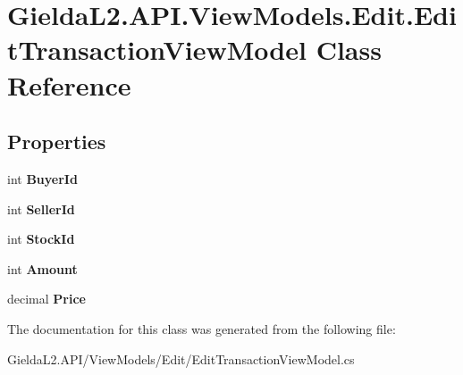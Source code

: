\hypertarget{class_gielda_l2_1_1_a_p_i_1_1_view_models_1_1_edit_1_1_edit_transaction_view_model}{}\section{Gielda\+L2.\+A\+P\+I.\+View\+Models.\+Edit.\+Edit\+Transaction\+View\+Model Class Reference}
\label{class_gielda_l2_1_1_a_p_i_1_1_view_models_1_1_edit_1_1_edit_transaction_view_model}
\subsection*{Properties}
\begin{DoxyCompactItemize}
\item 
\mbox{\label{class_gielda_l2_1_1_a_p_i_1_1_view_models_1_1_edit_1_1_edit_transaction_view_model_afd4891d3e034df892ca9b2ae1d6d6ae6}} 
int {\bfseries Buyer\+Id}
\item 
\mbox{\label{class_gielda_l2_1_1_a_p_i_1_1_view_models_1_1_edit_1_1_edit_transaction_view_model_a12d1a9452607f89f3192eeb4061d3571}} 
int {\bfseries Seller\+Id}
\item 
\mbox{\label{class_gielda_l2_1_1_a_p_i_1_1_view_models_1_1_edit_1_1_edit_transaction_view_model_a05599da5b4e51eb02c3954ee13adc6f9}} 
int {\bfseries Stock\+Id}
\item 
\mbox{\label{class_gielda_l2_1_1_a_p_i_1_1_view_models_1_1_edit_1_1_edit_transaction_view_model_a245082b7f5fcded9156d0e0a43d3b3e8}} 
int {\bfseries Amount}
\item 
\mbox{\label{class_gielda_l2_1_1_a_p_i_1_1_view_models_1_1_edit_1_1_edit_transaction_view_model_a857f5a8344e31733a7bf83982195a6be}} 
decimal {\bfseries Price}
\end{DoxyCompactItemize}


The documentation for this class was generated from the following file\+:\begin{DoxyCompactItemize}
\item 
Gielda\+L2.\+A\+P\+I/\+View\+Models/\+Edit/Edit\+Transaction\+View\+Model.\+cs\end{DoxyCompactItemize}
